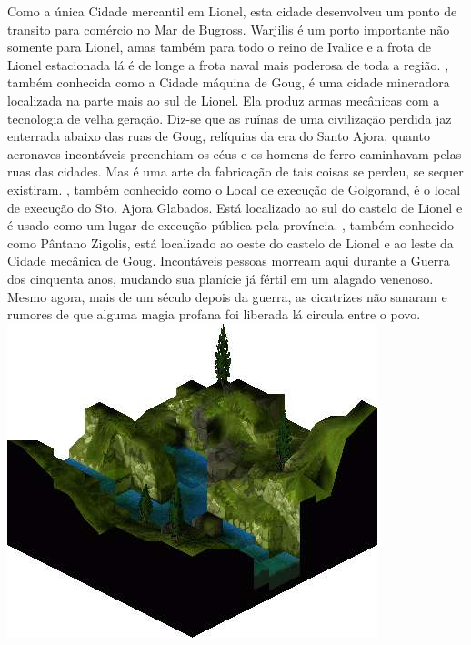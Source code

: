 Como a única Cidade mercantil em Lionel, esta cidade desenvolveu um ponto de transito para comércio no Mar de Bugross.
Warjilis é um porto importante não somente para Lionel, amas também para todo o reino de Ivalice e a frota de Lionel estacionada lá é de longe a frota naval mais poderosa de toda a região.
, também conhecida como a Cidade máquina de Goug, é uma cidade mineradora localizada na parte mais ao sul de Lionel.
Ela produz armas mecânicas com a tecnologia de velha geração. Diz-se que as ruínas de uma civilização perdida jaz enterrada abaixo das ruas de Goug, relíquias da era do Santo Ajora, quanto aeronaves incontáveis preenchiam os céus e os homens de ferro caminhavam pelas ruas das cidades.
Mas é uma arte da fabricação de tais coisas se perdeu, se sequer existiram.
, também conhecido como o Local de execução de Golgorand, é o local de execução do Sto. Ajora Glabados.
Está localizado ao sul do castelo de Lionel e é usado como um lugar de execução pública pela província.
, também conhecido como Pântano Zigolis, está localizado ao oeste do castelo de Lionel e ao leste da Cidade mecânica de Goug.
Incontáveis pessoas morream aqui durante a Guerra dos cinquenta anos, mudando sua planície já fértil em um alagado venenoso.
Mesmo agora, mais de um século depois da guerra, as cicatrizes não sanaram e rumores de que alguma magia profana foi liberada lá circula entre o povo.
%
\vfill
\includegraphics[width=\columnwidth]{./art/worldbook/bariaus.jpg}
